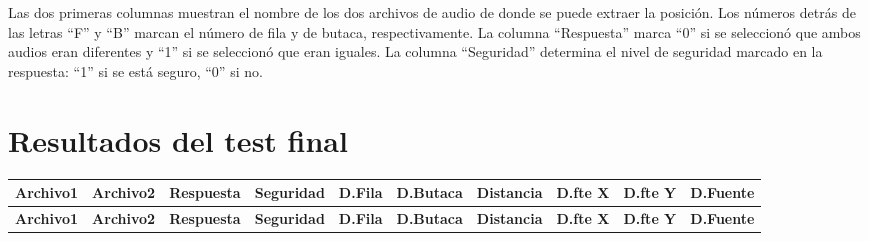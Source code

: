 \documentclass[11pt,a4paper,twoside]{book}
\begin{document}
\normalsize		
Las dos primeras columnas muestran el nombre de los dos archivos de audio de donde se puede extraer la posición. Los números detrás de las letras ``F'' y ``B'' marcan el número de fila y de butaca, respectivamente. La columna ``Respuesta'' marca ``0'' si se seleccionó que ambos audios eran diferentes y ``1'' si se seleccionó que eran iguales. La columna ``Seguridad'' determina el nivel de seguridad marcado en la respuesta: ``1'' si se está seguro, ``0'' si no.

\section{Resultados del test final}

\scriptsize
\begin{longtable}[c]{|c|c|c|c|c|c|c|c|c|c|}

		\hline
		\textbf{Archivo1}&\textbf{Archivo2}&\textbf{Respuesta}&\textbf{Seguridad}&\textbf{D.Fila}&\textbf{D.Butaca}&\textbf{Distancia}&\textbf{D.fte X}&\textbf{D.fte Y}&\textbf{D.Fuente}\\ \hline
		\endfirsthead
		\hline
		\textbf{Archivo1}&\textbf{Archivo2}&\textbf{Respuesta}&\textbf{Seguridad}&\textbf{D.Fila}&\textbf{D.Butaca}&\textbf{Distancia}&\textbf{D.fte X}&\textbf{D.fte Y}&\textbf{D.Fuente}\\ \hline
		\endhead
		

\end{longtable}
\end{document}
